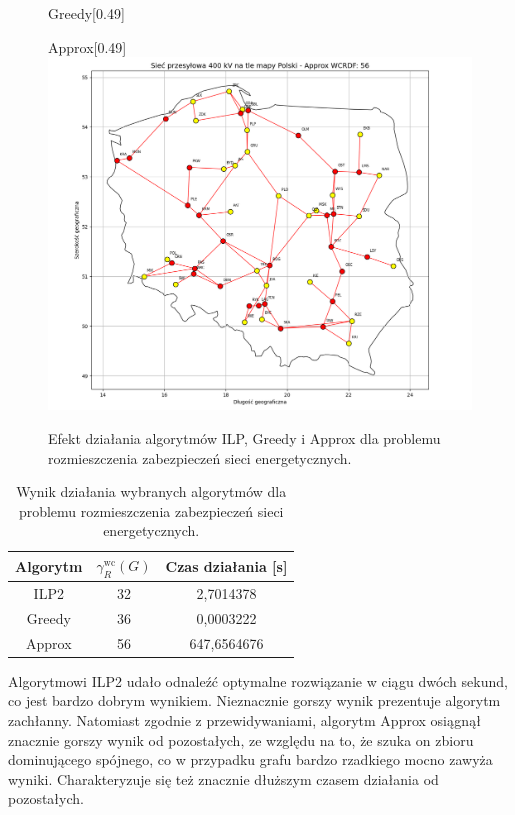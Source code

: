 \begin{figure}[htbp]
\begin{subcaptionbox}{Greedy\label{fig:img2}}[0.49\linewidth]
    \end{subcaptionbox}
    \hfill
    \begin{subcaptionbox}{Approx\label{fig:img1}}[0.49\linewidth]
        {\includegraphics[width=\linewidth]{assets/Poland/img_1.png}}
    \end{subcaptionbox}
    \caption{Efekt działania algorytmów ILP, Greedy i Approx dla problemu rozmieszczenia zabezpieczeń sieci energetycznych.}
    \label{fig:poland}
\end{figure}

\begin{table}[H]
    \centering
    \begin{tabular}{|c|c|c|}
        \hline
    Algorytm & $\gamma^{\text{wc}}_R(G)$ & Czas działania [s] \\     \hline
    ILP2 & 32 & 2,7014378 \\ \hline
    Greedy & 36 & 0,0003222 \\ \hline
Approx & 56 & 647,6564676 \\ \hline
\end{tabular}
\caption{Wynik działania wybranych algorytmów dla problemu rozmieszczenia zabezpieczeń sieci energetycznych.}
\end{table}

Algorytmowi ILP2 udało odnaleźć optymalne rozwiązanie w ciągu dwóch sekund, co jest bardzo dobrym wynikiem. Nieznacznie gorszy wynik prezentuje algorytm zachłanny. Natomiast zgodnie z przewidywaniami, algorytm Approx osiągnął znacznie gorszy wynik od pozostałych, ze względu na to, że szuka on zbioru dominującego spójnego, co w przypadku grafu bardzo rzadkiego mocno zawyża wyniki. Charakteryzuje się też znacznie dłuższym czasem działania od pozostałych.\\

